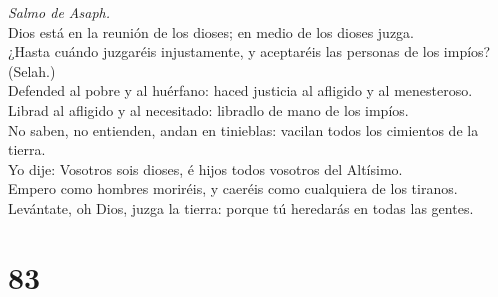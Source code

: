  \emph{Salmo de Asaph.}\\
Dios está en la reunión de los dioses; en medio de los dioses juzga.\\
 ¿Hasta cuándo juzgaréis injustamente, y aceptaréis las
personas de los impíos? (Selah.)\\
 Defended al pobre y al huérfano: haced justicia al afligido
y al menesteroso.\\
 Librad al afligido y al necesitado: libradlo de mano de los
impíos.\\
 No saben, no entienden, andan en tinieblas: vacilan todos
los cimientos de la tierra.\\
 Yo dije: Vosotros sois dioses, é hijos todos vosotros del
Altísimo.\\
 Empero como hombres moriréis, y caeréis como cualquiera de
los tiranos.\\
 Levántate, oh Dios, juzga la tierra: porque tú heredarás en
todas las gentes.

\hypertarget{section-82}{%
\section{83}\label{section-82}}

